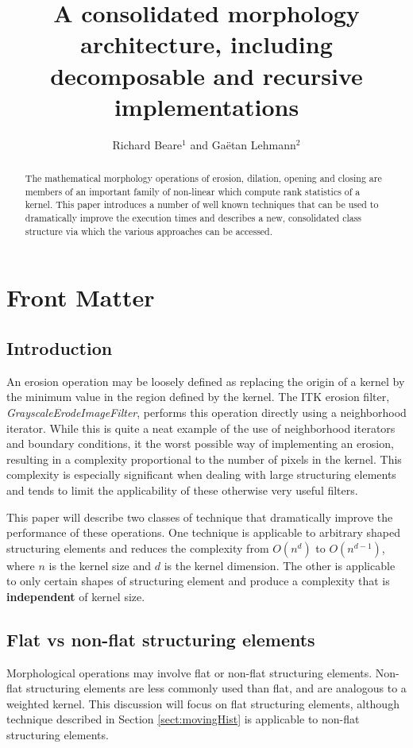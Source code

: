 \documentclass{InsightArticle}
\title{A consolidated morphology architecture, including decomposable and recursive implementations}
\author{Richard Beare{$^1$} {\small{and}} Ga\"etan Lehmann{$^2$}}
\begin{document}
\maketitle

\ifhtml
\chapter*{Front Matter\label{front}}
\fi


\begin{abstract}
\noindent
The mathematical morphology operations of erosion, dilation, opening
and closing are members of an important family of non-linear which
compute rank statistics of a kernel. This paper introduces a number of
well known techniques that can be used to dramatically improve the
execution times and describes a new, consolidated class structure via
which the various approaches can be accessed.
\end{abstract}

\tableofcontents


\section{Introduction}
An erosion operation may be loosely defined as replacing the origin of
a kernel by the minimum value in the region defined by the kernel. The
ITK erosion filter, {\em GrayscaleErodeImageFilter}, performs this
operation directly using a neighborhood iterator. While this is quite
a neat example of the use of neighborhood iterators and boundary
conditions, it the worst possible way of implementing an erosion,
resulting in a complexity proportional to the number of pixels in the
kernel. This complexity is especially significant when dealing with
large structuring elements and tends to limit the applicability of
these otherwise very useful filters.

This paper will describe two classes of technique that dramatically
improve the performance of these operations. One technique is
applicable to arbitrary shaped structuring elements and reduces the
complexity from $O(n^d)$ to $O(n^{d-1})$, where $n$ is the kernel size
and $d$ is the kernel dimension. The other is applicable to only
certain shapes of structuring element and produce a complexity that is
{\bf independent} of kernel size.

\section{Flat vs non-flat structuring elements}
Morphological operations may involve flat or non-flat structuring
elements. Non-flat structuring elements are less commonly used than
flat, and are analogous to a weighted kernel. This discussion will
focus on flat structuring elements, although technique described in
Section \ref{sect:movingHist} is applicable to non-flat structuring
elements.
\end{document}

